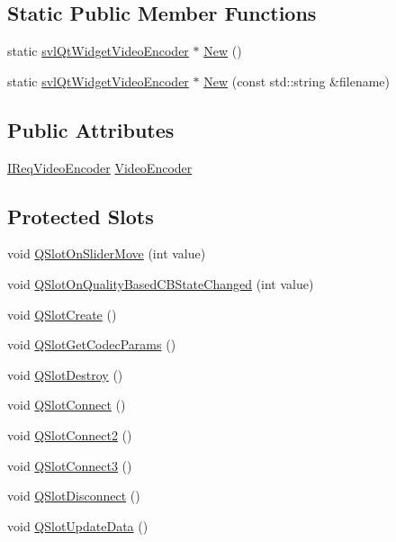 \subsection*{Static Public Member Functions}
\begin{DoxyCompactItemize}
\item 
static \hyperlink{classsvl_qt_widget_video_encoder}{svl\+Qt\+Widget\+Video\+Encoder} $\ast$ \hyperlink{classsvl_qt_widget_video_encoder_a89b65a49e24d6e9c54bc42e5e974dd82}{New} ()
\item 
static \hyperlink{classsvl_qt_widget_video_encoder}{svl\+Qt\+Widget\+Video\+Encoder} $\ast$ \hyperlink{classsvl_qt_widget_video_encoder_a95cdd49b6285a77d7e1d3a455d43334a}{New} (const std\+::string \&filename)
\end{DoxyCompactItemize}
\subsection*{Public Attributes}
\begin{DoxyCompactItemize}
\item 
\hyperlink{class_i_req_video_encoder}{I\+Req\+Video\+Encoder} \hyperlink{classsvl_qt_widget_video_encoder_a2ed567dc99004fa316aae01879a44994}{Video\+Encoder}
\end{DoxyCompactItemize}
\subsection*{Protected Slots}
\begin{DoxyCompactItemize}
\item 
void \hyperlink{classsvl_qt_widget_video_encoder_ae6fba1aa0bec37fcb4577ad58363cd0f}{Q\+Slot\+On\+Slider\+Move} (int value)
\item 
void \hyperlink{classsvl_qt_widget_video_encoder_a0b746277e625c82d239da136a1cd706b}{Q\+Slot\+On\+Quality\+Based\+C\+B\+State\+Changed} (int value)
\item 
void \hyperlink{classsvl_qt_widget_video_encoder_a06f6819cdee34cfa57eb1f048840a682}{Q\+Slot\+Create} ()
\item 
void \hyperlink{classsvl_qt_widget_video_encoder_a114cf3ba66b08d4df48e7aae932285ea}{Q\+Slot\+Get\+Codec\+Params} ()
\item 
void \hyperlink{classsvl_qt_widget_video_encoder_a7cb9827b56df5d64655d3a1fe56fbd4b}{Q\+Slot\+Destroy} ()
\item 
void \hyperlink{classsvl_qt_widget_video_encoder_a75404727f85823e9e130d0effb0c88f6}{Q\+Slot\+Connect} ()
\item 
void \hyperlink{classsvl_qt_widget_video_encoder_a2c2386b45785b68c97b1940aa67a73f6}{Q\+Slot\+Connect2} ()
\item 
void \hyperlink{classsvl_qt_widget_video_encoder_a48e14f82f19daa37f297a67da381959e}{Q\+Slot\+Connect3} ()
\item 
void \hyperlink{classsvl_qt_widget_video_encoder_a235f1542b527528ffe9f875059e1ff9e}{Q\+Slot\+Disconnect} ()
\item 
void \hyperlink{classsvl_qt_widget_video_encoder_aa94093ca17a79c4907a6b244e33fa749}{Q\+Slot\+Update\+Data} ()
\end{DoxyCompactItemize}
